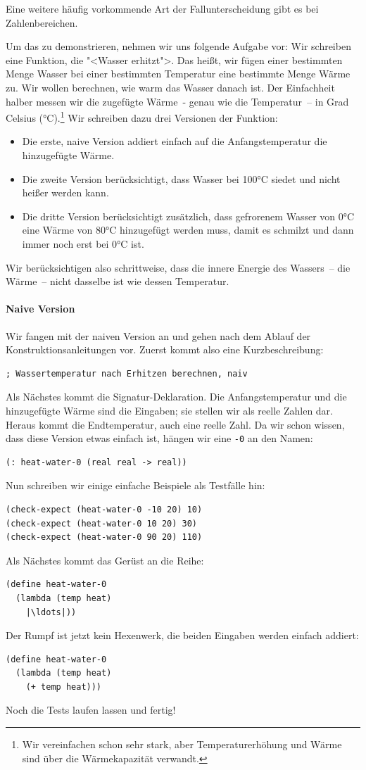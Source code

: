 Eine weitere häufig vorkommende Art der Fallunterscheidung gibt es bei
Zahlenbereichen.

Um das zu demonstrieren, nehmen wir uns folgende Aufgabe vor: Wir
schreiben eine Funktion, die "<Wasser erhitzt">.
Das heißt, wir fügen einer bestimmten Menge Wasser bei einer
bestimmten Temperatur eine bestimmte Menge Wärme zu.  Wir wollen
berechnen, wie warm das Wasser danach ist.  Der Einfachheit halber
messen wir die zugefügte Wärme~- genau wie die Temperatur~-- in Grad
Celsius (\si{\degree}C).\footnote{Wir vereinfachen schon sehr stark, aber 
  Temperaturerhöhung und Wärme sind über die Wärmekapazität verwandt.}
Wir schreiben dazu drei Versionen der
Funktion:
%
\begin{itemize}
\item Die erste, naive Version addiert einfach auf die
  Anfangstemperatur die hinzugefügte Wärme.
\item Die zweite Version berücksichtigt, dass Wasser bei 100\si{\degree}C siedet
  und nicht heißer werden kann.
\item Die dritte Version berücksichtigt zusätzlich, dass gefrorenem
  Wasser von 0\si{\degree}C eine Wärme von 80\si{\degree}C hinzugefügt werden muss, damit es
  schmilzt und dann immer noch erst bei 0\si{\degree}C ist.
\end{itemize}
%
Wir berücksichtigen also schrittweise, dass die innere Energie des
Wassers~-- die Wärme~-- nicht dasselbe ist wie dessen Temperatur.

\paragraph{Naive Version} Wir fangen mit der naiven Version an und gehen nach dem Ablauf der
Konstruktionsanleitungen vor.  Zuerst kommt also eine
Kurzbeschreibung:
%
\begin{lstlisting}
; Wassertemperatur nach Erhitzen berechnen, naiv
\end{lstlisting}
%
Als Nächstes kommt die Signatur-Deklaration.  Die Anfangstemperatur
und die hinzugefügte Wärme sind die Eingaben; sie stellen wir als
reelle Zahlen dar.  Heraus kommt die Endtemperatur, auch eine reelle
Zahl.  Da wir schon wissen, dass diese Version etwas einfach ist,
hängen wir eine \lstinline{-0} an den Namen:
%
\begin{lstlisting}
(: heat-water-0 (real real -> real))
\end{lstlisting}                
%
Nun schreiben wir einige einfache Beispiele als Testfälle hin:
%
\begin{lstlisting}
(check-expect (heat-water-0 -10 20) 10)
(check-expect (heat-water-0 10 20) 30)
(check-expect (heat-water-0 90 20) 110)
\end{lstlisting}
%
Als Nächstes kommt das Gerüst an die Reihe:
%
\begin{lstlisting}
(define heat-water-0
  (lambda (temp heat)
    |\ldots|))
\end{lstlisting}
%
Der Rumpf ist jetzt kein Hexenwerk, die beiden Eingaben werden
einfach addiert:
%
\begin{lstlisting}
(define heat-water-0
  (lambda (temp heat)
    (+ temp heat)))
\end{lstlisting}
%
Noch die Tests laufen lassen und fertig!

